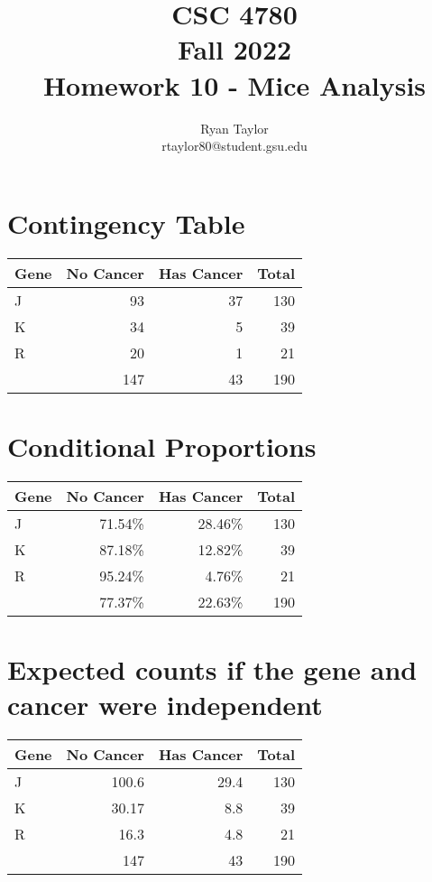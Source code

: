 \documentclass[11pt,english]{article}
\begin{document}
\title{CSC 4780 \\
Fall 2022\\ Homework 10 - Mice Analysis}
\author{Ryan Taylor \\ rtaylor80@student.gsu.edu}
\maketitle

\section{Contingency Table}

\begin{tabular}{l|rr|r}
 Gene & No Cancer & Has Cancer & Total \\
\hline
 J   &  93 & 37 & 130 \\
 K   &  34 &  5 &  39 \\
 R   &  20 &  1 &  21 \\
 \hline
     & 147 & 43 & 190 \\
\end{tabular}

\section{Conditional Proportions}

\begin{tabular}{l|rr|r}
 Gene & No Cancer & Has Cancer & Total \\
\hline
 J   & 71.54\% & 28.46\% & 130  \\
 K   & 87.18\% & 12.82\% &  39  \\
 R   & 95.24\% &  4.76\% &  21  \\
 \hline
     & 77.37\% & 22.63\% & 190  \\
\end{tabular}

\section{Expected counts if the gene and cancer were independent}

\begin{tabular}{l|rr|r}
 Gene & No Cancer & Has Cancer & Total \\
\hline
 J   & 100.6 & 29.4 & 130 \\
 K   & 30.17  &  8.8 &  39 \\
 R   & 16.3  &  4.8 &  21 \\
 \hline
     & 147    & 43    & 190 \\
\end{tabular}
\end{document}
